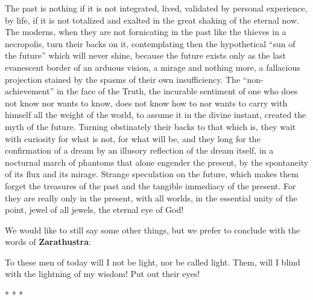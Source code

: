 The past is nothing if it is not integrated, lived, validated by personal experience, by life, if it is not totalized and exalted in the great shaking of the eternal now. The moderns, when they are not fornicating in the past like the thieves in a necropolis, turn their backs on it, contemplating then the hypothetical ``sun of the future'' which will never shine, because the future exists only as the last evanescent border of an arduous vision, a mirage and nothing more, a fallacious projection stained by the spasms of their own insufficiency. The ``non-achievement'' in the face of the Truth, the incurable sentiment of one who does not know nor wants to know, does not know how to nor wants to carry with himself all the weight of the world, to assume it in the divine instant, created the myth of the future. Turning obstinately their backs to that which is, they wait with curiosity for what is not, for what will be, and they long for the confirmation of a dream by an illusory reflection of the dream itself, in a nocturnal march of phantoms that alone engender the present, by the spontaneity of its flux and its mirage. Strange speculation on the future, which makes them forget the treasures of the past and the tangible immediacy of the present. For they are really only in the present, with all worlds, in the essential unity of the point, jewel of all jewels, the eternal eye of God!

We would like to still say some other things, but we prefer to conclude with the words of \textbf{Zarathustra}:

\begin{quotex}
To these men of today will I not be light, nor be called light. Them, will I blind with the lightning of my wisdom! Put out their eyes!
\end{quotex}




\begin{center}* * *\end{center}

